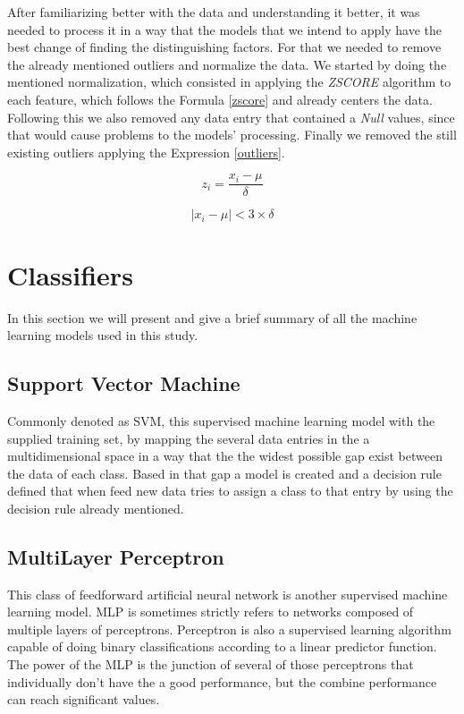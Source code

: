 \documentclass[conference]{IEEEtran}
\begin{document}
After familiarizing better with the data and understanding it better, it was needed to process it in a way that the models that we intend to apply have the best change of finding the distinguishing factors. For that we needed to remove the already mentioned outliers and normalize the data. We started by doing the mentioned normalization, which consisted in applying the \textit{ZSCORE} algorithm to each feature, which follows the Formula \ref{zscore} and already centers the data. Following this we also removed any data entry that contained a \textit{Null} values, since that would cause problems to the models' processing. Finally we removed the still existing outliers applying the Expression \ref{outliers}.

\begin{equation}\label{zscore}
    z_{i} = \frac{x_{i} - \mu}{\delta}
\end{equation}

\begin{equation}\label{outliers}
    |x_{i}-\mu| < 3\times\delta
\end{equation}

\section{Classifiers}
In this section we will present and give a brief summary of all the machine learning models used in this study.

\subsection{Support Vector Machine}
Commonly denoted as SVM, this supervised machine learning model with the supplied training set, by mapping the several data entries in the a multidimensional space in a way that the the widest possible gap exist between the data of each class. Based in that gap a model is created and a decision rule defined that when feed new data tries to assign a class to that entry by using the decision rule already mentioned.

\subsection{MultiLayer Perceptron}
This class of feedforward artificial neural network is another supervised machine learning model. MLP is sometimes strictly refers to networks composed of multiple layers of perceptrons. Perceptron is also a supervised learning algorithm capable of doing binary classifications according to a linear predictor function. The power of the MLP is the junction of several of those perceptrons that individually don't have the a good performance, but the combine performance can reach significant values.
\end{document}
